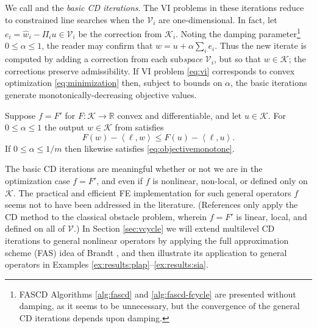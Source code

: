 \documentclass[review,hidelinks,onefignum,onetabnum]{siamart220329}
\newcommand{\RR}{\mathbb{R}}
\newcommand{\cK}{\mathcal{K}}
\newcommand{\cV}{\mathcal{V}}
\newcommand{\ip}[2]{\left<#1,#2\right>}
\begin{document}
We call  and  the \emph{basic CD iterations}.  The VI problems in these iterations reduce to constrained line searches when the $\cV_i$ are one-dimensional.  In fact, let $e_i = \hat w_i - \Pi_i u \in \cV_i$ be the correction from $\cK_i$.  Noting the damping parameter\footnote{FASCD Algorithms \ref{alg:fascd} and \ref{alg:fascd-fcycle} are presented without damping, as it seems to be unnecessary, but the convergence of the general CD iterations depends upon damping.} $0\le \alpha \le 1$, the reader may confirm that $w = u + \alpha \sum_i e_i$.  Thus the new iterate is computed by adding a correction from each sub\emph{space} $\cV_i$, but so that $w \in \cK$; the corrections preserve admissibility.  If VI problem \eqref{eq:vi} corresponds to convex optimization \eqref{eq:minimization} then, subject to bounds on $\alpha$, the basic iterations generate monotonically-decreasing objective values.

\begin{lemma} \cite{Tai2003}  Suppose $f=F'$ for $F:\cK\to\RR$ convex and differentiable, and let $u\in\cK$.  For $0 \le \alpha \le 1$ the output $w \in \cK$ from  satisfies
\begin{equation}
F(w) - \ip{\ell}{w} \le F(u) - \ip{\ell}{u}.  \label{eq:objectivemonotone}
\end{equation}
If $0 \le \alpha \le 1/m$ then  likewise satisfies \eqref{eq:objectivemonotone}.
\end{lemma}

The basic CD iterations are meaningful whether or not we are in the optimization case $f=F'$, and even if $f$ is nonlinear, non-local, or defined only on $\cK$.  The practical and efficient FE implementation for such general operators $f$ seems not to have been addressed in the literature.  (References \cite{GraeserKornhuber2009,Tai2003} only apply the CD method to the classical obstacle problem, wherein $f=F'$ is linear, local, and defined on all of $\mathcal{V}$.)  In Section \ref{sec:vcycle} we will extend multilevel CD iterations to general nonlinear operators by applying the full approximation scheme (FAS) idea of Brandt \cite{Brandt1977}, and then illustrate its application to general operators in Examples \ref{ex:results:plap}--\ref{ex:results:sia}.
\end{document}
